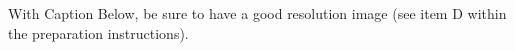 \label{fig:figure1} With Caption Below, be sure to have a good resolution image
                                  (see item D within the preparation instructions).